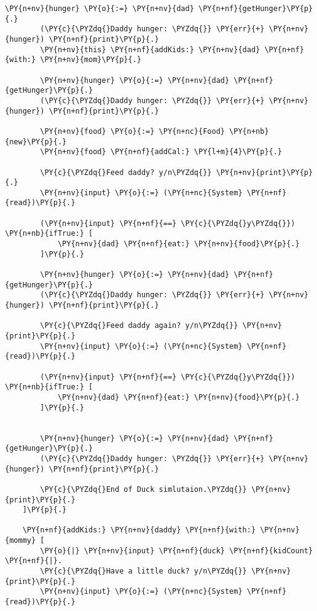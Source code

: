 \begin{Verbatim}[commandchars=\\\{\}]
        \PY{n+nv}{hunger} \PY{o}{:=} \PY{n+nv}{dad} \PY{n+nf}{getHunger}\PY{p}{.}
        (\PY{c}{\PYZdq{}Daddy hunger: \PYZdq{}} \PY{err}{+} \PY{n+nv}{hunger}) \PY{n+nf}{print}\PY{p}{.}
        \PY{n+nv}{this} \PY{n+nf}{addKids:} \PY{n+nv}{dad} \PY{n+nf}{with:} \PY{n+nv}{mom}\PY{p}{.}
        
        \PY{n+nv}{hunger} \PY{o}{:=} \PY{n+nv}{dad} \PY{n+nf}{getHunger}\PY{p}{.}
        (\PY{c}{\PYZdq{}Daddy hunger: \PYZdq{}} \PY{err}{+} \PY{n+nv}{hunger}) \PY{n+nf}{print}\PY{p}{.}
        
        \PY{n+nv}{food} \PY{o}{:=} \PY{n+nc}{Food} \PY{n+nb}{new}\PY{p}{.}
        \PY{n+nv}{food} \PY{n+nf}{addCal:} \PY{l+m}{4}\PY{p}{.}
        
        \PY{c}{\PYZdq{}Feed daddy? y/n\PYZdq{}} \PY{n+nv}{print}\PY{p}{.} 
        \PY{n+nv}{input} \PY{o}{:=} (\PY{n+nc}{System} \PY{n+nf}{read})\PY{p}{.}
        
        (\PY{n+nv}{input} \PY{n+nf}{==} \PY{c}{\PYZdq{}y\PYZdq{}}) \PY{n+nb}{ifTrue:} [
            \PY{n+nv}{dad} \PY{n+nf}{eat:} \PY{n+nv}{food}\PY{p}{.}
        ]\PY{p}{.}
        
        \PY{n+nv}{hunger} \PY{o}{:=} \PY{n+nv}{dad} \PY{n+nf}{getHunger}\PY{p}{.}
        (\PY{c}{\PYZdq{}Daddy hunger: \PYZdq{}} \PY{err}{+} \PY{n+nv}{hunger}) \PY{n+nf}{print}\PY{p}{.}
        
        \PY{c}{\PYZdq{}Feed daddy again? y/n\PYZdq{}} \PY{n+nv}{print}\PY{p}{.} 
        \PY{n+nv}{input} \PY{o}{:=} (\PY{n+nc}{System} \PY{n+nf}{read})\PY{p}{.}
        
        (\PY{n+nv}{input} \PY{n+nf}{==} \PY{c}{\PYZdq{}y\PYZdq{}}) \PY{n+nb}{ifTrue:} [
            \PY{n+nv}{dad} \PY{n+nf}{eat:} \PY{n+nv}{food}\PY{p}{.}
        ]\PY{p}{.}
        
        
        \PY{n+nv}{hunger} \PY{o}{:=} \PY{n+nv}{dad} \PY{n+nf}{getHunger}\PY{p}{.}
        (\PY{c}{\PYZdq{}Daddy hunger: \PYZdq{}} \PY{err}{+} \PY{n+nv}{hunger}) \PY{n+nf}{print}\PY{p}{.}
        
        \PY{c}{\PYZdq{}End of Duck simlutaion.\PYZdq{}} \PY{n+nv}{print}\PY{p}{.}
    ]\PY{p}{.}
    
    \PY{n+nf}{addKids:} \PY{n+nv}{daddy} \PY{n+nf}{with:} \PY{n+nv}{mommy} [
        \PY{o}{|} \PY{n+nv}{input} \PY{n+nf}{duck} \PY{n+nf}{kidCount} \PY{n+nf}{|}.
        \PY{c}{\PYZdq{}Have a little duck? y/n\PYZdq{}} \PY{n+nv}{print}\PY{p}{.} 
        \PY{n+nv}{input} \PY{o}{:=} (\PY{n+nc}{System} \PY{n+nf}{read})\PY{p}{.}
        

\end{Verbatim}
